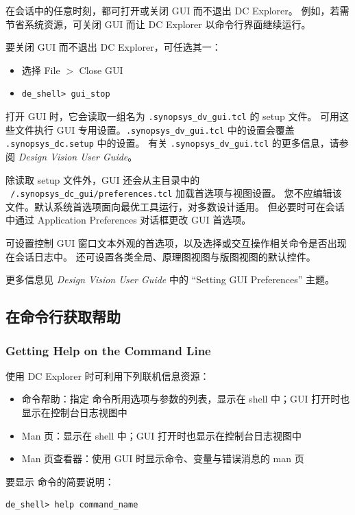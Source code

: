 在会话中的任意时刻，都可打开或关闭 GUI 而不退出 DC Explorer。
例如，若需节省系统资源，可关闭 GUI 而让 DC Explorer 以命令行界面继续运行。

要关闭 GUI 而不退出 DC Explorer，可任选其一：
\begin{itemize}
  \item 选择 File $>$ Close GUI
  \item \texttt{de\_shell> gui\_stop}
\end{itemize}

打开 GUI 时，它会读取一组名为 \texttt{.synopsys\_dv\_gui.tcl} 的 setup 文件。
可用这些文件执行 GUI 专用设置。\texttt{.synopsys\_dv\_gui.tcl} 中的设置会覆盖 \texttt{.synopsys\_dc.setup} 中的设置。
有关 \texttt{.synopsys\_dv\_gui.tcl} 的更多信息，请参阅 \textit{Design Vision User Guide}。

除读取 setup 文件外，GUI 还会从主目录中的 \texttt{\string~/.synopsys\_dc\_gui/preferences.tcl} 加载首选项与视图设置。
您不应编辑该文件。默认系统首选项面向最优工具运行，对多数设计适用。
但必要时可在会话中通过 Application Preferences 对话框更改 GUI 首选项。

可设置控制 GUI 窗口文本外观的首选项，以及选择或交互操作相关命令是否出现在会话日志中。
还可设置各类全局、原理图视图与版图视图的默认控件。

更多信息见 \textit{Design Vision User Guide} 中的 ``Setting GUI Preferences'' 主题。

\subsection{在命令行获取帮助}
\subsubsection*{Getting Help on the Command Line}

使用 DC Explorer 时可利用下列联机信息资源：
\begin{itemize}
  \item 命令帮助：指定  命令所用选项与参数的列表，显示在 shell 中；GUI 打开时也显示在控制台日志视图中
  \item Man 页：显示在 shell 中；GUI 打开时也显示在控制台日志视图中
  \item Man 页查看器：使用 GUI 时显示命令、变量与错误消息的 man 页
\end{itemize}

要显示  命令的简要说明：
\begin{lstlisting}
de_shell> help command_name
\end{lstlisting}

